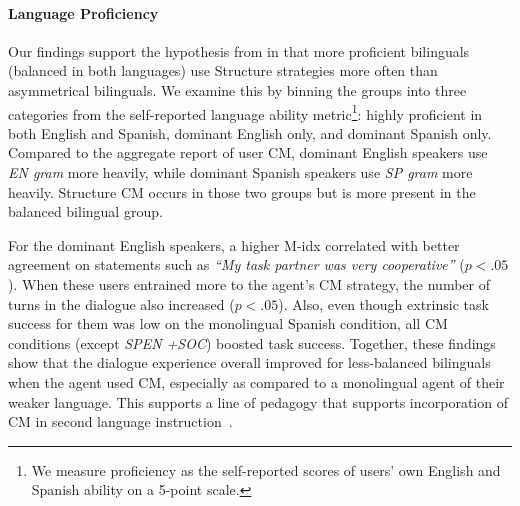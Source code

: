 \documentclass[11pt,a4paper]{article}
\newcommand{\ea}[1]{\textcolor{blue}{\bf\small [#1 --EA]}}
\begin{document}
\paragraph{Language Proficiency}

Our findings support the hypothesis from \citet{Deuchar2007} in that more proficient bilinguals (balanced in both languages) use Structure strategies more often than asymmetrical bilinguals. 
We examine this by binning the groups into three categories from the self-reported language ability metric\footnote{We measure proficiency as the self-reported scores of users' own English and Spanish ability on a 5-point scale.}: highly proficient in both English and Spanish, dominant English only, and dominant Spanish only.
Compared to the aggregate report of user CM, dominant English speakers use \textit{EN gram} more heavily, while dominant Spanish speakers use \textit{SP gram} more heavily.
Structure CM occurs in those two groups but is more present in the balanced bilingual group.

For the dominant English speakers, a higher M-idx correlated with better agreement on statements such as \textit{``My task partner was very cooperative''} ($p < .05$).
When these users entrained more to the agent's CM strategy, the number of turns in the dialogue also increased ($p < .05$). 
Also, even though extrinsic task success for them was low on the monolingual Spanish condition, all CM conditions (except \textit{SP\textrightarrow EN +SOC}) boosted task success.
Together, these findings show that the dialogue experience overall improved for less-balanced bilinguals when the agent used CM, especially as compared to a monolingual agent of their weaker language.
This supports a line of pedagogy that supports incorporation of CM in second language instruction~\citep[cf.][]{moore2002code}.
\end{document}
